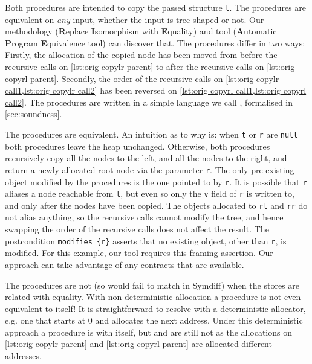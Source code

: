 \documentclass[runningheads,a4paper]{llncs}
\makeatletter
\newcommand*{\eg}{e.g.\@\xspace}
\makeatother
\begin{document}
\noindent
Both procedures are intended to copy the passed structure  \texttt{t}. The procedures are equivalent on \emph{any} input, whether the input is tree shaped or not. Our methodology \metho{} (\textbf{R}eplace \textbf{I}somorphism with \textbf{E}quality) and tool \tool{} (\textbf{A}utomatic \textbf{P}rogram \textbf{E}quivalence tool) can discover that. The procedures differ in two ways: Firstly, the allocation of the copied node has been moved from before the recursive calls on \cref{lst:orig copylr parent} to after the recursive calls on \cref{lst:orig copyrl parent}. Secondly, the order of the recursive calls on \cref{lst:orig copylr call1,lst:orig copylr call2} has been reversed on \cref{lst:orig copyrl call1,lst:orig copyrl call2}.   The procedures are written in a simple language we call \lang{}, formalised in \cref{sec:soundness}.

The procedures are equivalent. An intuition as to why is: when \texttt{t} or \texttt{r} are \texttt{null} both procedures leave the heap unchanged. Otherwise, both procedures recursively copy all the nodes to the left, and all the nodes to the right, and return a newly allocated root node via the parameter \texttt{r}. The only pre-existing object modified by the procedures is the one pointed to by \texttt{r}. It is possible that \texttt{r} aliases a node reachable from \texttt{t}, but even so only the \texttt{v} field of \texttt{r} is written to, and only after the nodes have been copied. The objects allocated to \texttt{rl} and \texttt{rr} do not alias anything, so the recursive calls cannot modify the tree, and hence swapping the order of the recursive calls does not affect the result. The postcondition \texttt{modifies \{r\}} asserts that no existing object, other than \texttt{r}, is modified. For this example, our tool \tool{} requires this framing assertion. Our approach can take advantage of any contracts that are available.

The procedures are not \symdiffequiva{} (so would fail to match in Symdiff) when the stores are related with equality. With non-deterministic allocation a procedure is not even equivalent to itself! It is straightforward to resolve with a deterministic allocator, \eg one that starts at 0 and allocates the next address. Under this deterministic approach a procedure is \symdiffequiva{} with itself, but \copylr{} and \copyrl{} are still not \symdiffequiva{} as the allocations on \cref{lst:orig copylr parent} and \cref{lst:orig copyrl parent} are allocated different addresses.
\end{document}
